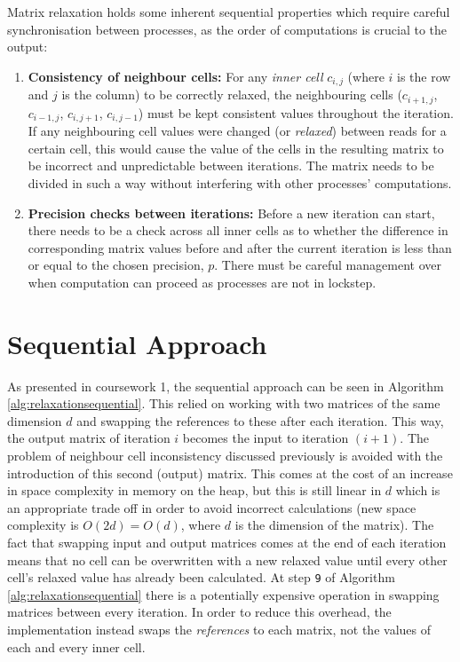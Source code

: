\documentclass[11pt]{article}
\begin{document}
Matrix relaxation holds some inherent sequential properties which require careful synchronisation between processes, as the order of computations is crucial to the output:
\begin{enumerate}
\item \textbf{Consistency of neighbour cells:} For any \textit{inner cell} $c_{i,j}$ (where $i$ is the row and $j$ is the column) to be correctly relaxed, the neighbouring cells ($c_{i+1,j}$, $c_{i-1,j}$, $c_{i,j+1}$, $c_{i,j-1}$) must be kept consistent values throughout the iteration. If any neighbouring cell values were changed (or \textit{relaxed}) between reads for a certain cell, this would cause the value of the cells in the resulting matrix to be incorrect and unpredictable between iterations.  The matrix needs to be divided in such a way without interfering with other processes' computations.
\item \textbf{Precision checks between iterations:} Before a new iteration can start, there needs to be a check across all inner cells as to whether the difference in corresponding matrix values before and after the current iteration is less than or equal to the chosen precision, $p$. There must be careful management over when computation can proceed as processes are not in lockstep.
\end{enumerate}

{\color{indigo} 
\section{Sequential Approach}
\label{sec:seqapproach}}
As presented in coursework 1, the sequential approach can be seen in Algorithm \ref{alg:relaxationsequential}. This relied on working with two matrices of the same dimension $d$ and swapping the references to these after each iteration. This way, the output matrix of iteration $i$ becomes the input to iteration $(i+1)$.  The problem of neighbour cell inconsistency discussed previously is avoided with the introduction of this second (output) matrix. This comes at the cost of an increase in space complexity in memory on the heap, but this is still linear in $d$ which is an appropriate trade off in order to avoid incorrect calculations (new space complexity is $O(2d) = O(d)$, where $d$ is the dimension of the matrix). The fact that swapping input and output matrices comes at the end of each iteration means that no cell can be overwritten with a new relaxed value until every other cell's relaxed value has already been calculated. At step \texttt{9} of Algorithm \ref{alg:relaxationsequential} there is a potentially expensive operation in swapping matrices between every iteration. In order to reduce this overhead, the implementation instead swaps the \textit{references} to each matrix, not the values of each and every inner cell. 
\end{document}
